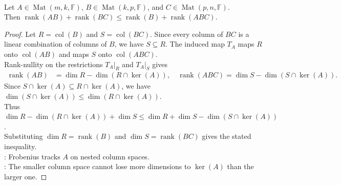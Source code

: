 \begin{theorem} \label{thm:frobenius-rank-inequality} \\
Let $A\in\operatorname{Mat}(m,k,\mathbb{F})$, $B\in\operatorname{Mat}(k,p,\mathbb{F})$, and $C\in\operatorname{Mat}(p,n,\mathbb{F})$.\\
Then $\operatorname{rank}(AB)+\operatorname{rank}(BC) \leq \operatorname{rank}(B)+\operatorname{rank}(ABC)$.
\begin{proof}
Let $R=\operatorname{col}(B)$ and $S=\operatorname{col}(BC)$. Since every column of $BC$ is a linear combination of columns of $B$, we have $S\subseteq R$. The induced map $T_A$ maps $R$ onto $\operatorname{col}(AB)$ and maps $S$ onto $\operatorname{col}(ABC)$.\\
Rank-nullity on the restrictions $T_A|_R$ and $T_A|_S$ gives
\begin{align}
\operatorname{rank}(AB)&=\dim R-\dim(R\cap\ker(A)), \quad \operatorname{rank}(ABC)=\dim S-\dim(S\cap\ker(A)). \nonumber
\end{align}
Since $S\cap\ker(A)\subseteq R\cap\ker(A)$, we have $\dim(S\cap\ker(A))\leq\dim(R\cap\ker(A))$.\\
Thus $\dim R-\dim(R\cap\ker(A))+\dim S \leq \dim R+\dim S-\dim(S\cap\ker(A))$.\\
Substituting $\dim R=\operatorname{rank}(B)$ and $\dim S=\operatorname{rank}(BC)$ gives the stated inequality.\\
: Frobenius tracks $A$ on nested column spaces.\\
: The smaller column space cannot lose more dimensions to $\ker(A)$ than the larger one.
\end{proof}
\end{theorem}

